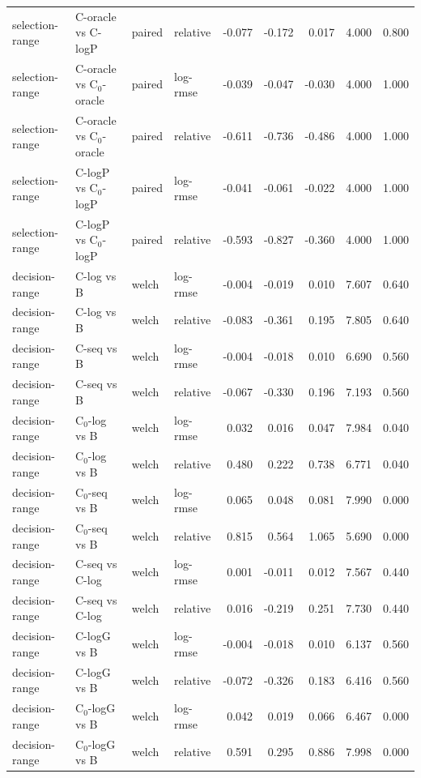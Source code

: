 \begin{longtable}{llllrrrrr}
selection-range & C-oracle vs C-logP & paired & relative & -0.077 & -0.172 & 0.017 & 4.000 & 0.800 \\
selection-range & C-oracle vs C$_0$-oracle & paired & log-rmse & -0.039 & -0.047 & -0.030 & 4.000 & 1.000 \\
selection-range & C-oracle vs C$_0$-oracle & paired & relative & -0.611 & -0.736 & -0.486 & 4.000 & 1.000 \\
selection-range & C-logP vs C$_0$-logP & paired & log-rmse & -0.041 & -0.061 & -0.022 & 4.000 & 1.000 \\
selection-range & C-logP vs C$_0$-logP & paired & relative & -0.593 & -0.827 & -0.360 & 4.000 & 1.000 \\
decision-range & C-log vs B & welch & log-rmse & -0.004 & -0.019 & 0.010 & 7.607 & 0.640 \\
decision-range & C-log vs B & welch & relative & -0.083 & -0.361 & 0.195 & 7.805 & 0.640 \\
decision-range & C-seq vs B & welch & log-rmse & -0.004 & -0.018 & 0.010 & 6.690 & 0.560 \\
decision-range & C-seq vs B & welch & relative & -0.067 & -0.330 & 0.196 & 7.193 & 0.560 \\
decision-range & C$_0$-log vs B & welch & log-rmse & 0.032 & 0.016 & 0.047 & 7.984 & 0.040 \\
decision-range & C$_0$-log vs B & welch & relative & 0.480 & 0.222 & 0.738 & 6.771 & 0.040 \\
decision-range & C$_0$-seq vs B & welch & log-rmse & 0.065 & 0.048 & 0.081 & 7.990 & 0.000 \\
decision-range & C$_0$-seq vs B & welch & relative & 0.815 & 0.564 & 1.065 & 5.690 & 0.000 \\
decision-range & C-seq vs C-log & welch & log-rmse & 0.001 & -0.011 & 0.012 & 7.567 & 0.440 \\
decision-range & C-seq vs C-log & welch & relative & 0.016 & -0.219 & 0.251 & 7.730 & 0.440 \\
decision-range & C-logG vs B & welch & log-rmse & -0.004 & -0.018 & 0.010 & 6.137 & 0.560 \\
decision-range & C-logG vs B & welch & relative & -0.072 & -0.326 & 0.183 & 6.416 & 0.560 \\
decision-range & C$_0$-logG vs B & welch & log-rmse & 0.042 & 0.019 & 0.066 & 6.467 & 0.000 \\
decision-range & C$_0$-logG vs B & welch & relative & 0.591 & 0.295 & 0.886 & 7.998 & 0.000 \\

\end{longtable}
